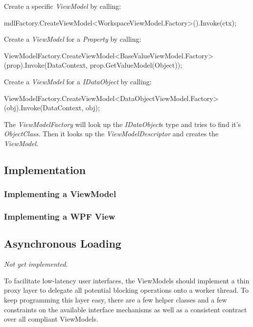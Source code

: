Create a specific \emph{ViewModel} by calling:

\begin{CS}
	mdlFactory.CreateViewModel<WorkspaceViewModel.Factory>().Invoke(ctx);
\end{CS}

Create a \emph{ViewModel} for a \emph{Property} by calling:

\begin{CS}
	ViewModelFactory.CreateViewModel<BaseValueViewModel.Factory>(prop).Invoke(DataContext,
prop.GetValueModel(Object));
\end{CS}

Create a \emph{ViewModel} for a \emph{IDataObject} by calling:

\begin{CS}
	ViewModelFactory.CreateViewModel<DataObjectViewModel.Factory>(obj).Invoke(DataContext, obj);
\end{CS}

The \emph{ViewModelFactory} will look up the \emph{IDataObject}s type and tries
to find it's \emph{ObjectClass}. Then it looks up the \emph{ViewModelDescriptor}
and creates the \emph{ViewModel}.

\subsection{Implementation}

\subsubsection{Implementing a ViewModel}

\subsubsection{Implementing a WPF View}



\subsection{Asynchronous Loading}

\emph{Not yet implemented.}

To facilitate low-latency user interfaces, the ViewModels should implement a
thin proxy layer to delegate all potential blocking operations onto a worker
thread. To keep programming this layer easy, there are a few helper classes and
a few constraints on the available interface mechanisms as well as a consistent
contract over all compliant ViewModels.


